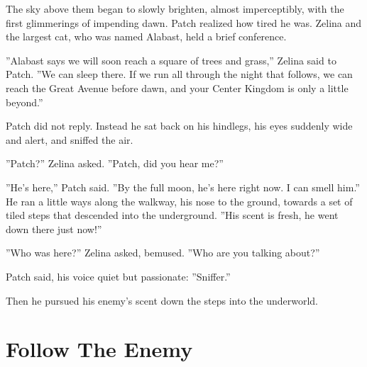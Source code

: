 \documentclass[12pt]{book}
\begin{document}
The sky above them began to slowly brighten, almost imperceptibly, with the first glimmerings of impending dawn. Patch realized how tired he was. Zelina and the largest cat, who was named Alabast, held a brief conference.\par
''Alabast says we will soon reach a square of trees and grass,'' Zelina said to Patch. ''We can sleep there. If we run all through the night that follows, we can reach the Great Avenue before dawn, and your Center Kingdom is only a little beyond.''\par
Patch did not reply. Instead he sat back on his hindlegs, his eyes suddenly wide and alert, and sniffed the air.\par
''Patch?'' Zelina asked. ''Patch, did you hear me?''\par
''He's here,'' Patch said. ''By the full moon, he's here right now. I can smell him.'' He ran a little ways along the walkway, his nose to the ground, towards a set of tiled steps that descended into the underground. ''His scent is fresh, he went down there just now!''\par
''Who was here?'' Zelina asked, bemused. ''Who are you talking about?''\par
 Patch said, his voice quiet but passionate: ''Sniffer.''\par
Then he pursued his enemy's scent down the steps into the underworld.\par

\section{Follow The Enemy}
\end{document}

